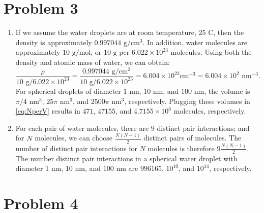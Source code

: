 \documentclass{article}
\begin{document}
\section{Problem 3}

\begin{enumerate}[label=\alph*)]
  \item If we assume the water droplets are at room temperature, $25 \text{ C}$, then the density is approximately $0.997044 \text{ g} / \text{cm}^3$.
    In addition, water molecules are approximately $10 \text{ g} / \text{mol}$, or $10 \text{ g}$ per $6.022 \times 10^{23}$ molecules.
    Using both the density and atomic mass of water, we can obtain:
    \begin{equation} \label{eq:NperV}
      \frac{\rho}{10 \text{ g} / 6.022 \times 10^{23}} = \frac{0.997044 \text{ g} / \text{cm}^3}{10 \text{ g} / 6.022 \times 10^{23}} = 6.004 \times 10^{23} \text{cm}^{-3} = 6.004 \times 10^{2} \text{ nm}^{-3}.
    \end{equation}
    For spherical droplets of diameter $1$ nm, $10$ nm, and $100$ nm, the volume is $\pi / 4 \text{ nm}^3$, $25 \pi \text{ nm}^3$, and $2500 \pi \text{ nm}^3$, respectively.
    Plugging these volumes in \eqref{eq:NperV} results in $471$, $47155$, and $4.7155 \times 10^6$ molecules, respectively.
  \item For each pair of water molecules, there are $9$ distinct pair interactions; and for $N$ molecules, we can choose $\frac{N(N-1)}{2}$ distinct pairs of molecules.
    The number of distinct pair interactions for $N$ molecules is therefore $9 \frac{N(N-1)}{2}$.
    The number distinct pair interactions in a spherical water droplet with diameter $1$ nm, $10$ nm, and $100$ nm are $996165$, $10^{10}$, and $10^{14}$, respectively.
\end{enumerate}

\section{Problem 4}
\end{document}

